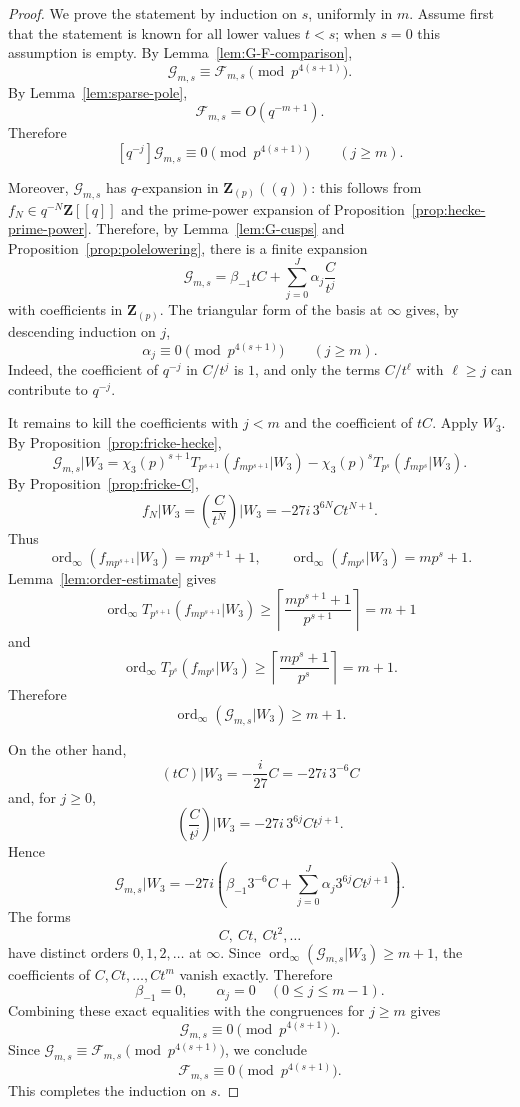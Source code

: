\documentclass[10pt,a4paper]{amsart}
\DeclareMathOperator{\ord}{ord}
\newcommand{\Z}{\mathbf Z}
\begin{document}
\begin{proof}
We prove the statement by induction on $s$, uniformly in $m$.
Assume first that the statement is known for all lower values $t<s$; when $s=0$ this assumption is empty.
By Lemma~\ref{lem:G-F-comparison},
\[
 \mathcal G_{m,s}\equiv\mathcal F_{m,s}\pmod {p^{4(s+1)}}.
\]
By Lemma~\ref{lem:sparse-pole},
\[
 \mathcal F_{m,s}=O(q^{-m+1}).
\]
Therefore
\[
 [q^{-j}]\mathcal G_{m,s}\equiv0\pmod {p^{4(s+1)}}
 \qquad(j\ge m).
\]

Moreover, $\mathcal G_{m,s}$ has $q$-expansion in $\Z_{(p)}((q))$: this follows from $f_N\in q^{-N}\Z[[q]]$ and the prime-power expansion of Proposition~\ref{prop:hecke-prime-power}.  Therefore, by Lemma~\ref{lem:G-cusps} and Proposition~\ref{prop:polelowering}, there is a finite expansion
\[
 \mathcal G_{m,s}=\beta_{-1}tC+\sum_{j=0}^{J}\alpha_j\frac{C}{t^j}
\]
with coefficients in $\Z_{(p)}$.  The triangular form of the basis at $\infty$ gives, by descending induction on $j$,
\[
 \alpha_j\equiv0\pmod {p^{4(s+1)}}
 \qquad(j\ge m).
\]
Indeed, the coefficient of $q^{-j}$ in $C/t^j$ is $1$, and only the terms $C/t^\ell$ with $\ell\ge j$ can contribute to $q^{-j}$.

It remains to kill the coefficients with $j<m$ and the coefficient of $tC$.  Apply $W_3$.  By Proposition~\ref{prop:fricke-hecke},
\[
 \mathcal G_{m,s}|W_3
 =\chi_3(p)^{s+1}T_{p^{s+1}}(f_{mp^{s+1}}|W_3)
 -\chi_3(p)^sT_{p^s}(f_{mp^s}|W_3).
\]
By Proposition~\ref{prop:fricke-C},
\[
 f_N|W_3=\left(\frac{C}{t^N}\right)\Big|W_3
 =-27i\,3^{6N}Ct^{N+1}.
\]
Thus
\[
 \ord_\infty(f_{mp^{s+1}}|W_3)=mp^{s+1}+1,
 \qquad
 \ord_\infty(f_{mp^s}|W_3)=mp^s+1.
\]
Lemma~\ref{lem:order-estimate} gives
\[
 \ord_\infty T_{p^{s+1}}(f_{mp^{s+1}}|W_3)
 \ge\left\lceil\frac{mp^{s+1}+1}{p^{s+1}}\right\rceil=m+1
\]
and
\[
 \ord_\infty T_{p^s}(f_{mp^s}|W_3)
 \ge\left\lceil\frac{mp^s+1}{p^s}\right\rceil=m+1.
\]
Therefore
\[
 \ord_\infty(\mathcal G_{m,s}|W_3)\ge m+1.
\]

On the other hand,
\[
 (tC)|W_3=-\frac{i}{27}C=-27i\,3^{-6}C
\]
and, for $j\ge0$,
\[
 \left(\frac{C}{t^j}\right)\Big|W_3
 =-27i\,3^{6j}Ct^{j+1}.
\]
Hence
\[
 \mathcal G_{m,s}|W_3
 =-27i\left(\beta_{-1}3^{-6}C+
 \sum_{j=0}^{J}\alpha_j3^{6j}Ct^{j+1}\right).
\]
The forms
\[
 C,\ Ct,\ Ct^2,\ldots
\]
have distinct orders $0,1,2,\ldots$ at $\infty$.  Since $\ord_\infty(\mathcal G_{m,s}|W_3)\ge m+1$, the coefficients of $C,Ct,\ldots,Ct^m$ vanish exactly.  Therefore
\[
 \beta_{-1}=0,
 \qquad
 \alpha_j=0\quad(0\le j\le m-1).
\]
Combining these exact equalities with the congruences for $j\ge m$ gives
\[
 \mathcal G_{m,s}\equiv0\pmod {p^{4(s+1)}}.
\]
Since $\mathcal G_{m,s}\equiv\mathcal F_{m,s}\pmod {p^{4(s+1)}}$, we conclude
\[
 \mathcal F_{m,s}\equiv0\pmod {p^{4(s+1)}}.
\]
This completes the induction on $s$.
\end{proof}
\end{document}
